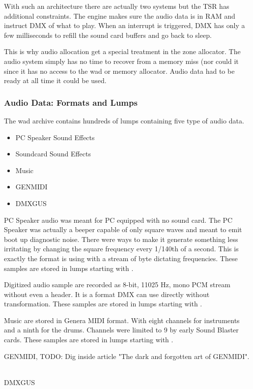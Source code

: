 With such an architecture there are actually two systems but the TSR has additional constraints. The engine makes sure the audio data is in RAM and instruct DMX of what to play. When an interrupt is triggered, DMX has only a few milliseconds to refill the sound card buffers and go back to sleep.\\
\par
 This is why audio allocation get a special treatment in the zone allocator. The audio system simply has no time to recover from a memory miss (nor could it since it has no access to the wad or memory allocator. Audio data had to be ready at all time it could be used.
\pagebreak

\subsubsection{Audio Data: Formats and Lumps}
The wad archive contains hundreds of lumps containing five type of audio data.
\begin{itemize}
  \item PC Speaker Sound Effects
  \item Soundcard Sound Effects
  \item Music
  \item GENMIDI
  \item DMXGUS
\end{itemize}
\par
PC Speaker audio was meant for PC equipped with no sound card. The PC Speaker was actually a beeper capable of only square waves and meant to emit boot up diagnostic noise. There were ways to make it generate something less irritating by changing the square frequency every 1/140th of a second. This is exactly the format \doom is using with a stream of byte dictating frequencies. These samples are stored in lumps starting with .\\
\par
 Digitized audio sample are recorded as 8-bit, 11025 Hz, mono PCM stream without even a header. It is a format DMX can use directly without transformation.  These samples are stored in lumps starting with .\\
\par
Music are stored in Genera MIDI format. With eight channels for instruments and a ninth for the drums. Channels were limited to 9 by early Sound Blaster cards. These samples are stored in lumps starting with .\\
\par
GENMIDI, TODO: Dig inside article "The dark and forgotten art of GENMIDI".\\\\
\par
DMXGUS\\
\par
\pagebreak



